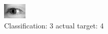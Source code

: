 \begin{figure}[h!]
\begin{center}
\includegraphics[width=0.60\columnwidth]{figures/ID3273_class_3_target_4.png}
\end{center}
\caption{ Classification: 3 actual target: 4}
\label{fig:ID3273_class_3_target_4}
\end{figure}
